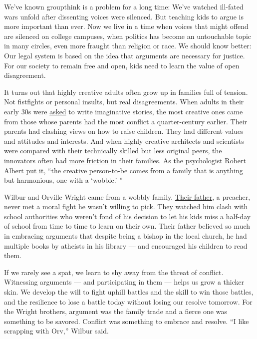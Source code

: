 We've known groupthink is a problem for a long time: We've watched
ill-fated wars unfold after dissenting voices were silenced. But
teaching kids to argue is more important than ever. Now we live in a
time when voices that might offend are silenced on college campuses,
when politics has become an untouchable topic in many circles, even more
fraught than religion or race. We should know better: Our legal system
is based on the idea that arguments are necessary for justice. For our
society to remain free and open, kids need to learn the value of open
disagreement.

It turns out that highly creative adults often grow up in families full
of tension. Not fistfights or personal insults, but real disagreements.
When adults in their early 30s were
\href{http://www.sciencedirect.com/science/article/pii/S0092656698922401}{asked}
to write imaginative stories, the most creative ones came from those
whose parents had the most conflict a quarter-century earlier. Their
parents had clashing views on how to raise children. They had different
values and attitudes and interests. And when highly creative architects
and scientists were compared with their technically skilled but less
original peers, the innovators often had
\href{http://psycnet.apa.org/record/1965-15301-001}{more friction} in
their families. As the psychologist Robert Albert
\href{https://books.google.com/books?id=MrFyrO_ZWPgC\&pg=PA175\&lpg=PA175\&dq=robert+s.+albert+creativity+wobble\&source=bl\&ots=qlsoQY7Uhm\&sig=CjY-9g1f0T-UCiNssGbvI1duOqg\&hl=en\&sa=X\&ved=0ahUKEwiCg7XtsvfUAhVMaD4KHQhTCvMQ6AEIJzAB\#v=onepage\&q=robert\%20s.\%20albert\%20creativity\%20wobble\&f=false}{put
it}, ``the creative person-to-be comes from a family that is anything
but harmonious, one with a `wobble.' ''

Wilbur and Orville Wright came from a wobbly family.
\href{http://articles.latimes.com/1989-09-03/books/bk-2324_1_wright-brothers}{Their
father}, a preacher, never met a moral fight he wasn't willing to pick.
They watched him clash with school authorities who weren't fond of his
decision to let his kids miss a half-day of school from time to time to
learn on their own. Their father believed so much in embracing arguments
that despite being a bishop in the local church, he had multiple books
by atheists in his library --- and encouraged his children to read them.

If we rarely see a spat, we learn to shy away from the threat of
conflict. Witnessing arguments --- and participating in them --- helps
us grow a thicker skin. We develop the will to fight uphill battles and
the skill to win those battles, and the resilience to lose a battle
today without losing our resolve tomorrow. For the Wright brothers,
argument was the family trade and a fierce one was something to be
savored. Conflict was something to embrace and resolve. ``I like
scrapping with Orv,'' Wilbur said.

